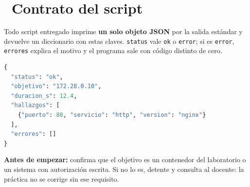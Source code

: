 \documentclass[11pt,a4paper]{article}
\newcommand{\iconotexto}[2]{\textcolor{cyanNeon}{\faIcon{#1}}~#2}
\begin{document}
\section{\iconotexto{code}{Contrato del script}}

\begin{cajaConcepto}Todo script entregado imprime \textbf{un solo objeto JSON} por la salida estándar y devuelve un diccionario con estas claves. \texttt{status} vale \texttt{ok} o \texttt{error}; si es \texttt{error}, \texttt{errores} explica el motivo y el programa sale con código distinto de cero.
\begin{lstlisting}[language=Python,style=estiloPython]
{
  "status": "ok",
  "objetivo": "172.28.0.10",
  "duracion_s": 12.4,
  "hallazgos": [
    {"puerto": 80, "servicio": "http", "version": "nginx"}
  ],
  "errores": []
}
\end{lstlisting}
\end{cajaConcepto}

\begin{tcolorbox}[cajaMejora]\textbf{Antes de empezar:} confirma que el objetivo es un contenedor del laboratorio o un sistema con autorización escrita. Si no lo es, detente y consulta al docente: la práctica no se corrige sin ese requisito.
\end{tcolorbox}
\end{document}
